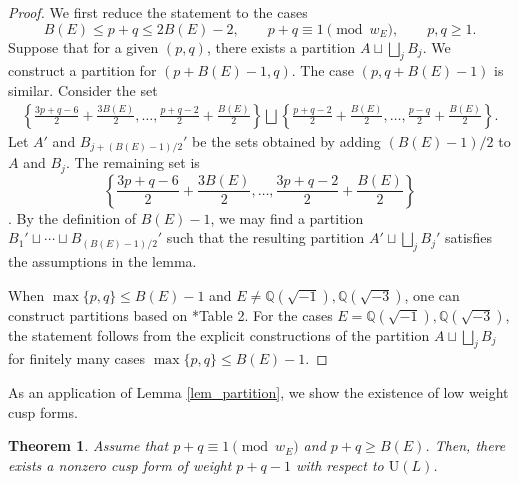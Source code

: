 \documentclass[11pt]{amsart}
\theoremstyle{plain}
\newtheorem{thm}{Theorem}[section]
\theoremstyle{definition}
\numberwithin{equation}{section}
\def\U{\mathrm{U}}
\newcommand{\bbQ}{\mathbb{Q}}
\begin{document}
\begin{proof}
    We first reduce the statement to the cases \[
B(E)\leq p+q\leq2B(E)-2,\qquad
p+q\equiv1\pmod{w_E},\qquad p,q\geq1.
\]
    Suppose that for a given $(p,q)$, there exists a partition $A \sqcup \bigsqcup_j B_j$.
    We construct a partition for $(p+B(E)-1, q)$.
    The case $(p,q+B(E)-1)$ is similar.
    Consider the set
    \begin{align*}
    \left\{\frac{3p+q-6}{2}+\frac{3B(E)}{2},\ldots,\frac{p+q-2}{2}+\frac{B(E)}{2}\right\} \bigsqcup \left\{\frac{p+q-2}{2}+\frac{B(E)}{2},\ldots,\frac{p-q}{2}+\frac{B(E)}{2}\right\}.
    \end{align*}
    Let $A'$ and $B_{j+(B(E)-1)/2}'$ be the sets obtained by adding $(B(E)-1)/2$ to $A$ and $B_j$.
    The remaining set is
\[\left\{\frac{3p+q-6}{2} + \frac{3B(E)}{2},\ldots,\frac{3p+q-2}{2}+\frac{B(E)}{2}\right\}\].
    By the definition of $B(E)-1$, we may find a partition $B_1' \sqcup \cdots \sqcup B_{(B(E)-1)/2}'$ such that the resulting partition $A' \sqcup \bigsqcup_j B_j'$ satisfies the assumptions in the lemma.

    When $\max\{p,q\} \leq B(E)-1$ and $E \neq \bbQ(\sqrt{-1}), \bbQ(\sqrt{-3})$, one can construct partitions based on \cite{2025_HMY_Kodaira_dimension_ball_quotients}*{Table 2}.
    For the cases $E = \bbQ(\sqrt{-1}), \bbQ(\sqrt{-3})$, the statement follows from the explicit constructions of the partition $A \sqcup \bigsqcup_j B_j$ for finitely many cases $\max\{p,q\} \leq B(E)-1$.  
\end{proof}




As an application of Lemma \ref{lem_partition}, we show the existence of low weight cusp forms.

\begin{thm}
\label{thm:low weight cusp form}
Assume that $p+q\equiv 1 \pmod{w_E}$ and $p+q \geq B(E)$.
Then, there exists a nonzero cusp form of weight $p+q-1$ with respect to $\U(L)$.
\end{thm}
\end{document}

